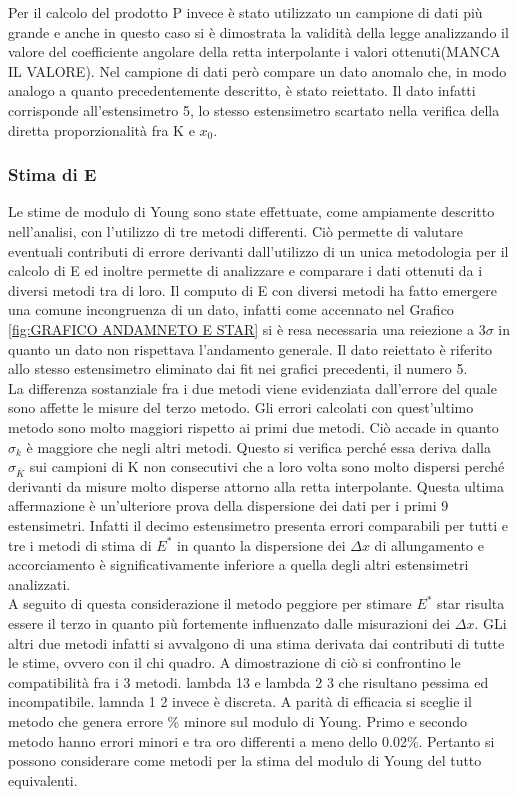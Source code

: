 \documentclass[a4paper,11pt,oneside]{article}
\begin{document}
Per il calcolo del prodotto P invece è stato utilizzato un campione di dati più grande e anche in questo caso si è dimostrata la validità della legge analizzando il valore del coefficiente angolare della retta interpolante i valori ottenuti(MANCA IL VALORE). Nel campione di dati però compare un dato anomalo che, in modo analogo a quanto precedentemente descritto, è stato reiettato. Il dato infatti corrisponde all'estensimetro 5, lo stesso estensimetro scartato nella verifica della diretta proporzionalità fra K e $x_{0}$.\\

\subsubsection*{Stima di E}
Le stime de modulo di Young sono state effettuate, come ampiamente descritto nell'analisi, con l'utilizzo di tre metodi differenti. Ciò permette di valutare eventuali contributi di errore derivanti dall'utilizzo di un unica metodologia per il calcolo di E ed inoltre permette di analizzare e comparare i dati ottenuti da i diversi metodi tra di loro. Il computo di E con diversi metodi ha fatto emergere una comune incongruenza di un dato, infatti come accennato nel Grafico \ref{fig:GRAFICO ANDAMNETO E STAR} si è resa necessaria una reiezione a $3\sigma$ in quanto un dato non rispettava l'andamento generale. Il dato reiettato è riferito allo stesso estensimetro eliminato dai fit nei grafici precedenti, il numero 5.\\
La differenza sostanziale fra i due metodi viene evidenziata dall'errore del quale sono affette le misure del terzo metodo. Gli errori calcolati con quest'ultimo metodo sono molto maggiori rispetto ai primi due metodi. Ciò accade in quanto $\sigma_k$ è maggiore che negli altri metodi. Questo si verifica perché essa deriva dalla $\sigma_{\overline{K}}$ sui campioni di K non consecutivi che a loro volta sono molto dispersi perché derivanti da misure molto disperse attorno alla retta interpolante. Questa ultima affermazione è un'ulteriore prova della dispersione dei dati per i primi 9 estensimetri. Infatti il decimo estensimetro presenta errori comparabili per tutti e tre i metodi di stima di $E^{\ast}$ in quanto la dispersione dei $\Delta x$ di allungamento e accorciamento è significativamente inferiore a quella degli altri estensimetri analizzati.\\
A seguito di questa considerazione il metodo peggiore per stimare $E^\ast$ star risulta essere il terzo in quanto più fortemente influenzato dalle misurazioni dei $\Delta x$. GLi altri due metodi infatti si avvalgono di una stima derivata dai contributi di tutte le stime, ovvero con il chi quadro. A dimostrazione di ciò si confrontino le compatibilità fra i 3 metodi. lambda 13 e lambda 2 3 che risultano pessima ed incompatibile. lamnda 1 2 invece è discreta. A parità di efficacia si sceglie il metodo che genera errore \% minore sul modulo di Young. Primo e secondo metodo hanno errori minori e tra oro differenti a meno dello 0.02\%. Pertanto si possono considerare come metodi per la stima del modulo di Young del tutto equivalenti.
\end{document}
